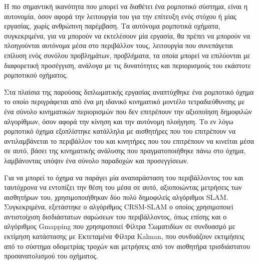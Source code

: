 \documentclass[
11pt, %
twoside, %
english,
headsepline, %
]{MastersDoctoralThesis} %
\begin{document}

\begin{summary}
Η πιο σημαντική ικανότητα που μπορεί να διαθέτει ένα ρομποτικό σύστημα, είναι η αυτονομία, όσον αφορά την λειτουργία του για την επίτευξη ενός στόχου ή μίας εργασίας, χωρίς ανθρώπινη παρέμβαση. Τα αυτόνομα ρομποτικά οχήματα, συγκεκριμένα, για να μπορούν να εκτελέσουν μία εργασία, θα πρέπει να μπορούν να πλοηγούνται αυτόνομα μέσα στο περιβάλλον τους, λειτουργία που συνεπάγεται επίλυση ενός συνόλου προβλημάτων, προβλήματα, τα οποία μπορεί να επιλύονται με διαφορετική προσέγγιση, ανάλογα με τις δυνατότητες και περιορισμούς του εκάστοτε ρομποτικού οχήματος.

\bigskip
Στα πλαίσια της παρούσας διπλωματικής εργασίας αναπτύχθηκε ένα ρομποτικό όχημα το οποίο περιγράφεται από ένα μη ιδανικό κινηματικό μοντέλο τετραδιεύθυνσης με ένα σύνολο κινηματικών περιορισμών που δεν επιτρέπουν την αξιοποίηση δημοφιλών αλγορίθμων, όσον αφορά την κίνηση και την αυτόνομη πλοήγηση. Το εν λόγω ρομποτικό όχημα εξοπλίστηκε κατάλληλα με αισθητήρες που του επιτρέπουν να αντιλαμβάνεται το περιβάλλον του και κινητήρες που του επιτρέπουν να κινείται μέσα σε αυτό, βάσει της κινηματικής ανάλυσης που πραγματοποιήθηκε πάνω στο όχημα, λαμβάνοντας υπόψιν ένα σύνολο παραδοχών και προσεγγίσεων.

\bigskip
Για να μπορεί το όχημα να παράγει μία αναπαράσταση του περιβάλλοντος του και ταυτόχρονα να εντοπίζει την θέση του μέσα σε αυτό, αξιοποιώντας μετρήσεις των αισθητήρων του, χρησιμοποιήθηκαν δύο πολύ δημοφιλείς αλγόριθμοι SLAM. Συγκεκριμένα, εξετάστηκε ο αλγόριθμος CRSM-SLAM ο οποίος χρησιμοποιεί αντιστοίχιση δισδιάστατων σαρώσεων του περιβάλλοντος, όπως επίσης και ο αλγόριθμος Gmapping που χρησιμοποιεί Φίλτρα Σωματιδίων σε συνδυασμό με εκτίμηση κατάστασης με Εκτεταμένα Φίλτρα Kalman, που συνδυάζουν εκτιμήσεις από το σύστημα οδομετρίας τροχών και μετρήσεις από τον αισθητήρα τρισδιάστατου προσανατολισμού του οχήματος.


\end{summary}
\end{document}
